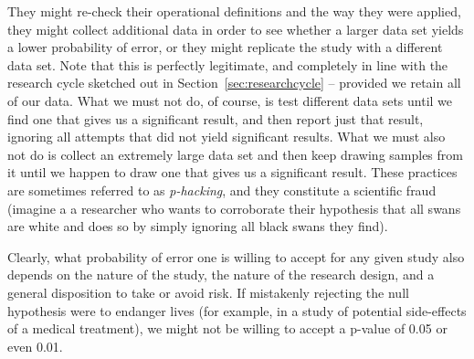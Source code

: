 They might re\hyp{}check their operational  definitions and the way they were applied, they might collect additional data in order to see whether a larger data set yields a lower probability  of error, or they might replicate  the study with a different data set. Note that this is perfectly legitimate, and completely in line with the research cycle sketched out in Section~\ref{sec:researchcycle} -- provided we retain all of our data. What we must not do, of course, is test different data sets until we find one that gives us a significant  result, and then report just that result, ignoring all attempts that did not yield significant results. What we must also not do is collect an extremely large  data set and then keep drawing samples  from it until we happen to draw one that gives us a significant result. These practices are sometimes referred to as \textit{p\hyp{}hacking}, and they constitute a scientific fraud (imagine a a researcher who wants to corroborate  their hypothesis that all swans are white and does so by simply ignoring all black swans they find).

Clearly, what probability  of error one is willing to accept for any given study also depends on the nature of the study, the nature of the research design,  and a general disposition to take or avoid risk. If mistakenly rejecting the null hypothesis  were to endanger lives (for example, in a study of potential side\hyp{}effects of a medical treatment), we might not be willing to accept a p\hyp{}value  of 0.05 or even 0.01.

